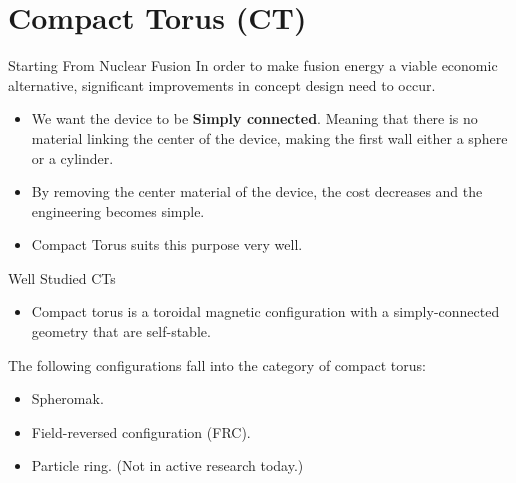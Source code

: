 \section{Compact Torus (CT)}
\begin{frame} {Starting From Nuclear Fusion}
    In order to make fusion energy a viable economic alternative, significant improvements in concept design need to occur.
    \begin{itemize}
        \item We want the device to be \textbf{Simply connected}. Meaning that there is no material linking the center of the device, making the first wall either a sphere or a cylinder.
        \item By removing the center material of the device, the cost decreases and the engineering becomes simple.
        \item Compact Torus suits this purpose very well.
    \end{itemize}
\end{frame}

\begin{frame} {Well Studied CTs}
    \begin{itemize}
        \item Compact torus is a toroidal magnetic configuration with a simply-connected geometry that are self-stable.
    \end{itemize}

    The following configurations fall into the category of compact torus:
    \begin{itemize}
        \item Spheromak.
        \item Field-reversed configuration (FRC).
        \item Particle ring. (Not in active research today.)
    \end{itemize}
\end{frame}

